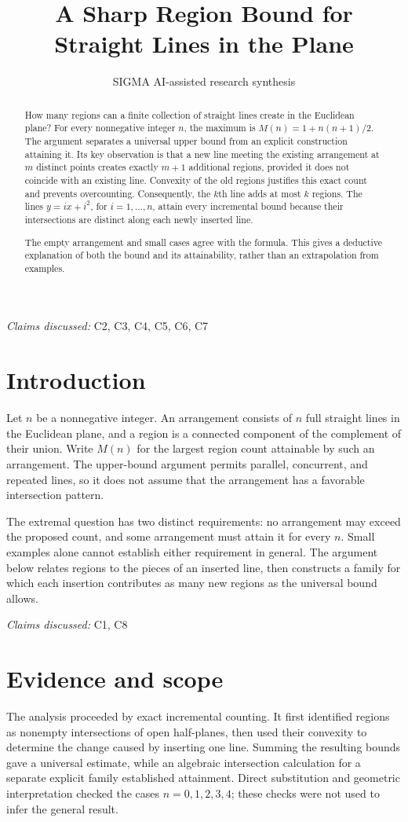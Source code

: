 \documentclass[11pt]{article}
\title{A Sharp Region Bound for Straight Lines in the Plane}
\date{}
\author{SIGMA AI-assisted research synthesis}
\begin{document}
\maketitle

\begin{abstract}
How many regions can a finite collection of straight lines create in the Euclidean plane? For every nonnegative integer $n$, the maximum is $M(n)=1+n(n+1)/2$. The argument separates a universal upper bound from an explicit construction attaining it. Its key observation is that a new line meeting the existing arrangement at $m$ distinct points creates exactly $m+1$ additional regions, provided it does not coincide with an existing line. Convexity of the old regions justifies this exact count and prevents overcounting. Consequently, the $k$th line adds at most $k$ regions. The lines $y=ix+i^2$, for $i=1,\ldots,n$, attain every incremental bound because their intersections are distinct along each newly inserted line.

The empty arrangement and small cases agree with the formula. This gives a deductive explanation of both the bound and its attainability, rather than an extrapolation from examples.
\end{abstract}
\textit{Claims discussed: }C2, C3, C4, C5, C6, C7
\section{Introduction}
Let $n$ be a nonnegative integer. An arrangement consists of $n$ full straight lines in the Euclidean plane, and a region is a connected component of the complement of their union. Write $M(n)$ for the largest region count attainable by such an arrangement. The upper-bound argument permits parallel, concurrent, and repeated lines, so it does not assume that the arrangement has a favorable intersection pattern.

The extremal question has two distinct requirements: no arrangement may exceed the proposed count, and some arrangement must attain it for every $n$. Small examples alone cannot establish either requirement in general. The argument below relates regions to the pieces of an inserted line, then constructs a family for which each insertion contributes as many new regions as the universal bound allows.

\textit{Claims discussed: }C1, C8
\section{Evidence and scope}
The analysis proceeded by exact incremental counting. It first identified regions as nonempty intersections of open half-planes, then used their convexity to determine the change caused by inserting one line. Summing the resulting bounds gave a universal estimate, while an algebraic intersection calculation for a separate explicit family established attainment. Direct substitution and geometric interpretation checked the cases $n=0,1,2,3,4$; these checks were not used to infer the general result.
\end{document}
